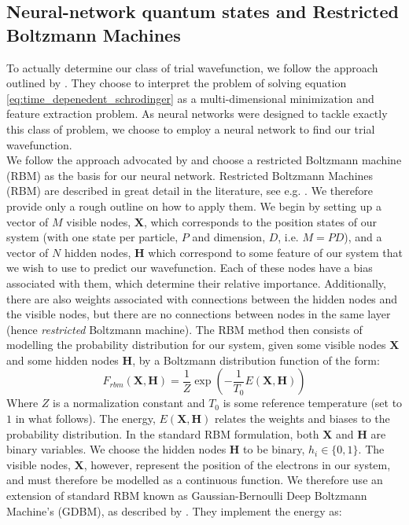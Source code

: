 \documentclass[a4paper, 10pt]{article}
\begin{document}
	\subsection{Neural-network quantum states and Restricted Boltzmann Machines}
	To actually determine our class of trial wavefunction, we follow the approach outlined by \cite{Carleo602}. They choose to interpret the problem of solving equation \ref{eq:time_depenedent_schrodinger} as a multi-dimensional minimization and feature extraction problem. As neural networks were designed to tackle exactly this class of problem, we choose to employ a neural network to find our trial wavefunction.\\
	\linebreak
	We follow the approach advocated by \cite{Carleo602} and choose a restricted Boltzmann machine (RBM) as the basis for our neural network. Restricted Boltzmann Machines (RBM) are described in great detail in the literature, see e.g. \cite{Hinton2010}. We therefore provide only a rough outline on how to apply them. We begin by setting up a vector of $M$ visible nodes, $\mathbf{X}$, which corresponds to the position states of our system (with one state per particle, $P$ and dimension, $D$, i.e. $M=PD$), and a vector of $N$ hidden nodes, $\mathbf{H}$ which correspond to some feature of our system that we wish to use to predict our wavefunction. Each of these nodes have a bias associated with them, which determine their relative importance. Additionally, there are also weights associated with connections between the hidden nodes and the visible nodes, but there are no connections between nodes in the same layer (hence \textit{restricted} Boltzmann machine). The RBM method then consists of modelling the probability distribution for our system, given some visible nodes $\mathbf{X}$ and some hidden nodes $\mathbf{H}$, by a Boltzmann distribution function of the form:
	\begin{equation}
	F_{rbm}(\mathbf{X}, \mathbf{H})=\frac{1}{Z}\exp \left(-\frac{1}{T_0}E(\mathbf{X},\mathbf{H})\right)
	\end{equation}
	Where $Z$ is a normalization constant and $T_0$ is some reference temperature (set to $1$ in what follows). The energy, $E(\boldsymbol{X}, \boldsymbol{H})$ relates the weights and biases to the probability distribution. In the standard RBM formulation, both $\boldsymbol{X}$ and $\boldsymbol{H}$ are binary variables. We choose the hidden nodes $\boldsymbol{H}$ to be binary, $h_i \in \{0,1\}$. The visible nodes, $\boldsymbol{X}$, however, represent the position of the electrons in our system, and must therefore be modelled as a continuous function. We therefore use an extension of standard RBM known as Gaussian-Bernoulli Deep Boltzmann Machine's (GDBM), as described by \cite{Wang2014}. They implement the energy as:
\end{document}
